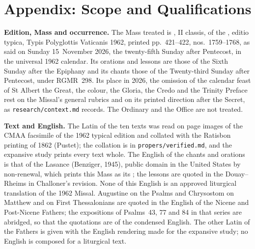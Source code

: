 
\section{Appendix: Scope and Qualifications}

{\footnotesize
\textbf{Edition, Mass and occurrence.} The Mass treated is , II classis, of the , editio typica, Typis Polyglottis Vaticanis 1962, printed
pp.~421--422, nos.~1759--1768, as said on Sunday 15~November 2026, the
twenty-fifth Sunday after Pentecost, in the universal 1962 calendar. Its
orations and lessons are those of the Sixth Sunday after the Epiphany and its
chants those of the Twenty-third Sunday after Pentecost, under RGMR~298. Its
place in 2026, the omission of the calendar feast of St Albert the Great, the
colour, the Gloria, the Credo and the Trinity Preface rest on the Missal's
general rubrics and on its printed direction after the Secret, as
\texttt{research/context.md} records. The Ordinary and the Office are not
treated.

\textbf{Text and English.} The Latin of the ten texts was read on page images
of the CMAA facsimile of the 1962 typical edition and collated with the
Ratisbon printing of 1862 (Pustet); the collation is in
\texttt{propers/verified.md}, and the expansive study prints every text whole.
The English of the chants and orations is that of the Lasance  (Benziger, 1945), public domain in the United States by non-renewal,
which prints this Mass as its ; the lessons are
quoted in the Douay--Rheims in Challoner's revision. None of this English is
an approved liturgical translation of the 1962 Missal. Augustine on the Psalms
and Chrysostom on Matthew and on First Thessalonians are quoted in the English
of the Nicene and Post-Nicene Fathers; the expositions of Psalms~43, 77 and 84
in that series are abridged, so that the quotations are of the condensed
English. The other Latin of the Fathers is given with the English rendering
made for the expansive study; no English is composed for a liturgical text.

}
